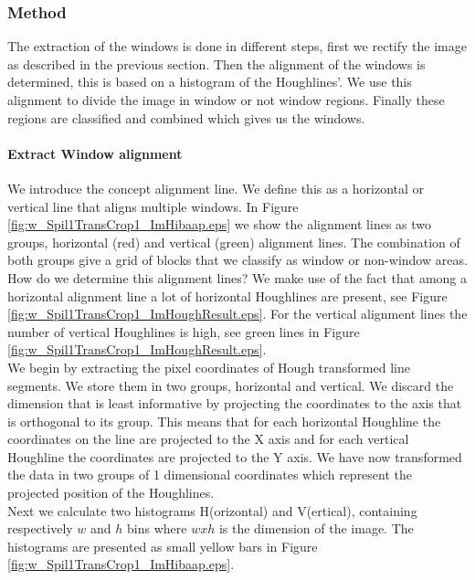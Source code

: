 \subsubsection{Method}
The extraction of the windows is done in different steps, first we rectify the
image as described in the previous section.  Then the alignment of the windows
is determined, this is based on a histogram of the Houghlines'. We use this
alignment to divide the image in window or not window regions.  Finally these
regions are classified and combined which gives us the windows.



\paragraph{Extract Window alignment}
We introduce the concept alignment line. We define this as a horizontal or
vertical line that aligns multiple windows. In Figure
\ref{fig:w_Spil1TransCrop1_ImHibaap.eps}
we show the alignment lines as two groups, horizontal (red) and
vertical (green) alignment lines.  The combination of both groups give a grid of
blocks that we classify as window or non-window areas.\\

How do we determine this alignment lines? We make use of the fact that among a
horizontal alignment line a lot of horizontal Houghlines are present, see
Figure \ref{fig:w_Spil1TransCrop1_ImHoughResult.eps}. For the vertical alignment lines
the number of vertical Houghlines is high, see green lines in Figure
\ref{fig:w_Spil1TransCrop1_ImHoughResult.eps}.\\

We begin by extracting the pixel coordinates of Hough transformed line
segments. We store them in two groups, horizontal and vertical.%
We discard the dimension that is least informative by projecting the coordinates to
the axis that is orthogonal to its group. 
This means that for each horizontal Houghline the coordinates on the line are projected to the X
axis and for each vertical Houghline the coordinates are projected to the Y
axis. We have now transformed the data in two groups of 1 dimensional
coordinates which represent the projected position of the Houghlines.\\

Next we calculate two histograms H(orizontal) and V(ertical), containing respectively
$w$ and $h$ bins where $w x h$ is the dimension of the image.  The histograms
are presented as small yellow bars in Figure \ref{fig:w_Spil1TransCrop1_ImHibaap.eps}.

